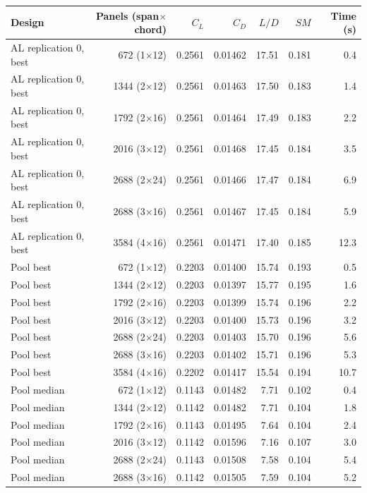 \begin{tabular}{@{}lrrrrrr@{}}
\toprule
Design & Panels (span$\times$chord) & $C_L$ & $C_{D}$ & $L/D$ & $SM$ & Time (s) \\
\midrule
AL replication 0, best & 672 (1$\times$12) & 0.2561 & 0.01462 & 17.51 & 0.181 & 0.4 \\
AL replication 0, best & 1344 (2$\times$12) & 0.2561 & 0.01463 & 17.50 & 0.183 & 1.4 \\
AL replication 0, best & 1792 (2$\times$16) & 0.2561 & 0.01464 & 17.49 & 0.183 & 2.2 \\
AL replication 0, best & 2016 (3$\times$12) & 0.2561 & 0.01468 & 17.45 & 0.184 & 3.5 \\
AL replication 0, best & 2688 (2$\times$24) & 0.2561 & 0.01466 & 17.47 & 0.184 & 6.9 \\
AL replication 0, best & 2688 (3$\times$16) & 0.2561 & 0.01467 & 17.45 & 0.184 & 5.9 \\
AL replication 0, best & 3584 (4$\times$16) & 0.2561 & 0.01471 & 17.40 & 0.185 & 12.3 \\
Pool best & 672 (1$\times$12) & 0.2203 & 0.01400 & 15.74 & 0.193 & 0.5 \\
Pool best & 1344 (2$\times$12) & 0.2203 & 0.01397 & 15.77 & 0.195 & 1.6 \\
Pool best & 1792 (2$\times$16) & 0.2203 & 0.01399 & 15.74 & 0.196 & 2.2 \\
Pool best & 2016 (3$\times$12) & 0.2203 & 0.01400 & 15.73 & 0.196 & 3.2 \\
Pool best & 2688 (2$\times$24) & 0.2203 & 0.01403 & 15.70 & 0.196 & 5.6 \\
Pool best & 2688 (3$\times$16) & 0.2203 & 0.01402 & 15.71 & 0.196 & 5.3 \\
Pool best & 3584 (4$\times$16) & 0.2202 & 0.01417 & 15.54 & 0.194 & 10.7 \\
Pool median & 672 (1$\times$12) & 0.1143 & 0.01482 & 7.71 & 0.102 & 0.4 \\
Pool median & 1344 (2$\times$12) & 0.1142 & 0.01482 & 7.71 & 0.104 & 1.8 \\
Pool median & 1792 (2$\times$16) & 0.1143 & 0.01495 & 7.64 & 0.104 & 2.4 \\
Pool median & 2016 (3$\times$12) & 0.1142 & 0.01596 & 7.16 & 0.107 & 3.0 \\
Pool median & 2688 (2$\times$24) & 0.1143 & 0.01508 & 7.58 & 0.104 & 5.4 \\
Pool median & 2688 (3$\times$16) & 0.1142 & 0.01505 & 7.59 & 0.104 & 5.2 \\

\end{tabular}
